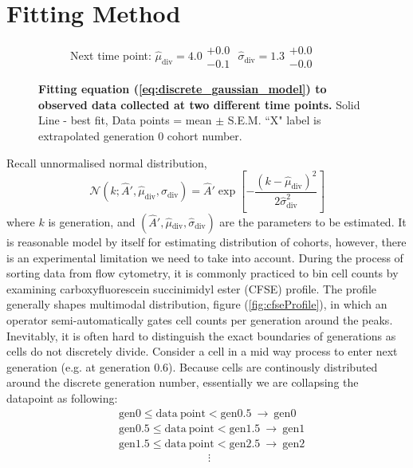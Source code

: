 \documentclass{article}
\newcommand{\enterProblemHeader}[1]{
}
\newcommand{\exitProblemHeader}[1]{
}
\newcounter{homeworkProblemCounter} %
\newcommand{\homeworkProblemName}{}
\newenvironment{homeworkProblem}[1][Problem \arabic{homeworkProblemCounter}]{ %
\stepcounter{homeworkProblemCounter} %
\renewcommand{\homeworkProblemName}{#1} %
\section{\homeworkProblemName} %
\enterProblemHeader{\homeworkProblemName} %
}{
\exitProblemHeader{\homeworkProblemName} %
}
\newcommand{\N}{\mathcal{N}}
\newcommand{\A}{\hat{A}}
\newcommand{\MU}{\hat{\mu}}
\newcommand{\SIGMA}{\hat{\sigma}}
\begin{document}
\begin{homeworkProblem}[Fitting Method]
\begin{figure}[t]
\begin{subfigure}[ht]{0.49\linewidth}
        \caption{Next time point: $\MU_{\mathrm{div}} = 4.0 \substack{+0.0 \\ -0.1}$  $\SIGMA_{\mathrm{div}} = 1.3 \substack{+0.0 \\ -0.0}$}
        \label{fig:DGt1}
    \end{subfigure}
    \caption{\textbf{Fitting equation (\ref{eq:discrete_gaussian_model}) to observed data collected at two different time points.} Solid Line - best fit, Data points = mean $\pm$ S.E.M. ``X" label is extrapolated generation 0 cohort number.}
    \label{fig:cohort_distribution}
\end{figure}
Recall unnormalised normal distribution,
\begin{equation}
    \N(k;\A', \MU_{\mathrm{div}}, \SIGMA_{\mathrm{div}}) = \A' \exp\left[-\frac{(k-\MU_{\mathrm{div}})^2}{2\SIGMA_{\mathrm{div}}^2}\right]
\end{equation}
where $k$ is generation, and $(\A', \MU{_\mathrm{div}}, \SIGMA_{\mathrm{div}})$ are the parameters to be estimated. It is reasonable model by itself for estimating distribution of cohorts, however, there is an experimental limitation we need to take into account. During the process of sorting data from flow cytometry, it is commonly practiced to bin cell counts by examining carboxyfluorescein succinimidyl ester (CFSE) profile. The profile generally shapes multimodal distribution, figure (\ref{fig:cfseProfile}), in which an operator semi-automatically gates cell counts per generation around the peaks. Inevitably, it is often hard to distinguish the exact boundaries of generations as cells do not discretely divide. Consider a cell in a mid way process to enter next generation (e.g. at generation 0.6). Because cells are continously distributed around the discrete generation number, essentially we are collapsing the datapoint as following:
\begin{align*}
    & \mathrm{gen}0 \leq \mathrm{data \ point} < \mathrm{gen}0.5 \ \rightarrow \ \mathrm{gen}0 \\
    & \mathrm{gen}0.5 \leq \mathrm{data \ point} < \mathrm{gen}1.5 \ \rightarrow \ \mathrm{gen}1 \\
    & \mathrm{gen}1.5 \leq \mathrm{data \ point} < \mathrm{gen}2.5 \ \rightarrow \ \mathrm{gen}2 \\
    & \qquad \qquad \qquad \qquad \vdots
\end{align*}
\begin{figure}
    \centering

\end{figure}
\end{homeworkProblem}
\end{document}
